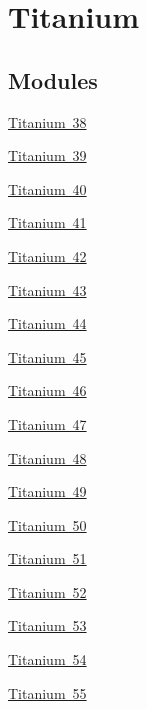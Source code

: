 \hypertarget{group___isotope_const-_titanium}{}\section{Titanium}
\label{group___isotope_const-_titanium}
\subsection*{Modules}
\begin{DoxyCompactItemize}
\item 
\mbox{\hyperlink{group___isotope_const-_titanium-_ti38}{Titanium 38}}
\item 
\mbox{\hyperlink{group___isotope_const-_titanium-_ti39}{Titanium 39}}
\item 
\mbox{\hyperlink{group___isotope_const-_titanium-_ti40}{Titanium 40}}
\item 
\mbox{\hyperlink{group___isotope_const-_titanium-_ti41}{Titanium 41}}
\item 
\mbox{\hyperlink{group___isotope_const-_titanium-_ti42}{Titanium 42}}
\item 
\mbox{\hyperlink{group___isotope_const-_titanium-_ti43}{Titanium 43}}
\item 
\mbox{\hyperlink{group___isotope_const-_titanium-_ti44}{Titanium 44}}
\item 
\mbox{\hyperlink{group___isotope_const-_titanium-_ti45}{Titanium 45}}
\item 
\mbox{\hyperlink{group___isotope_const-_titanium-_ti46}{Titanium 46}}
\item 
\mbox{\hyperlink{group___isotope_const-_titanium-_ti47}{Titanium 47}}
\item 
\mbox{\hyperlink{group___isotope_const-_titanium-_ti48}{Titanium 48}}
\item 
\mbox{\hyperlink{group___isotope_const-_titanium-_ti49}{Titanium 49}}
\item 
\mbox{\hyperlink{group___isotope_const-_titanium-_ti50}{Titanium 50}}
\item 
\mbox{\hyperlink{group___isotope_const-_titanium-_ti51}{Titanium 51}}
\item 
\mbox{\hyperlink{group___isotope_const-_titanium-_ti52}{Titanium 52}}
\item 
\mbox{\hyperlink{group___isotope_const-_titanium-_ti53}{Titanium 53}}
\item 
\mbox{\hyperlink{group___isotope_const-_titanium-_ti54}{Titanium 54}}
\item 
\mbox{\hyperlink{group___isotope_const-_titanium-_ti55}{Titanium 55}}

\end{DoxyCompactItemize}
